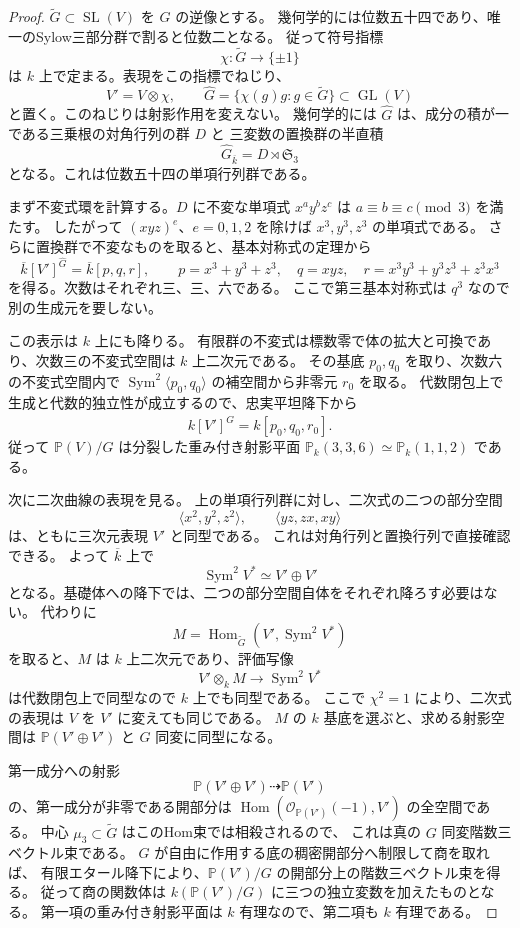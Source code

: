 \begin{proof}
$\widetilde G\subset\operatorname{SL}(V)$ を $G$ の逆像とする。
幾何学的には位数五十四であり、唯一のSylow三部分群で割ると位数二となる。
従って符号指標
\[
 \chi:\widetilde G\longrightarrow\{\pm1\}
\]
は $k$ 上で定まる。表現をこの指標でねじり、
\[
 V'=V\otimes\chi,\qquad
 \widehat G=\{\chi(g)g:g\in\widetilde G\}\subset\operatorname{GL}(V)
\]
と置く。このねじりは射影作用を変えない。
幾何学的には $\widehat G$ は、成分の積が一である三乗根の対角行列の群 $D$ と
三変数の置換群の半直積
\[
 \widehat G_{\overline k}=D\rtimes\mathfrak S_3
\]
となる。これは位数五十四の単項行列群である。

まず不変式環を計算する。$D$ に不変な単項式 $x^ay^bz^c$ は
$a\equiv b\equiv c\pmod3$ を満たす。
したがって $(xyz)^e$、$e=0,1,2$ を除けば $x^3,y^3,z^3$ の単項式である。
さらに置換群で不変なものを取ると、基本対称式の定理から
\[
 \overline k[V']^{\widehat G}
 =\overline k[p,q,r],\qquad
 p=x^3+y^3+z^3,\quad q=xyz,\quad
 r=x^3y^3+y^3z^3+z^3x^3
\]
を得る。次数はそれぞれ三、三、六である。
ここで第三基本対称式は $q^3$ なので別の生成元を要しない。

この表示は $k$ 上にも降りる。
有限群の不変式は標数零で体の拡大と可換であり、次数三の不変式空間は $k$ 上二次元である。
その基底 $p_0,q_0$ を取り、次数六の不変式空間内で
$\operatorname{Sym}^2\langle p_0,q_0\rangle$ の補空間から非零元 $r_0$ を取る。
代数閉包上で生成と代数的独立性が成立するので、忠実平坦降下から
\[
 k[V']^{\widehat G}=k[p_0,q_0,r_0].
\]
従って $\mathbb P(V)/G$ は分裂した重み付き射影平面
$\mathbb P_k(3,3,6)\simeq\mathbb P_k(1,1,2)$ である。

次に二次曲線の表現を見る。
上の単項行列群に対し、二次式の二つの部分空間
\[
 \langle x^2,y^2,z^2\rangle,
 \qquad \langle yz,zx,xy\rangle
\]
は、ともに三次元表現 $V'$ と同型である。
これは対角行列と置換行列で直接確認できる。
よって $\overline k$ 上で
\[
 \operatorname{Sym}^2V^*\simeq V'\oplus V'
\]
となる。基礎体への降下では、二つの部分空間自体をそれぞれ降ろす必要はない。
代わりに
\[
 M=\operatorname{Hom}_{\widetilde G}
       (V',\operatorname{Sym}^2V^*)
\]
を取ると、$M$ は $k$ 上二次元であり、評価写像
\[
 V'\otimes_kM\longrightarrow\operatorname{Sym}^2V^*
\]
は代数閉包上で同型なので $k$ 上でも同型である。
ここで $\chi^2=1$ により、二次式の表現は $V$ を $V'$ に変えても同じである。
$M$ の $k$ 基底を選ぶと、求める射影空間は
$\mathbb P(V'\oplus V')$ と $G$ 同変に同型になる。

第一成分への射影
\[
 \mathbb P(V'\oplus V')\dashrightarrow\mathbb P(V')
\]
の、第一成分が非零である開部分は
$\operatorname{Hom}(\mathcal O_{\mathbb P(V')}(-1),V')$ の全空間である。
中心 $\mu_3\subset\widetilde G$ はこのHom束では相殺されるので、
これは真の $G$ 同変階数三ベクトル束である。
$G$ が自由に作用する底の稠密開部分へ制限して商を取れば、
有限エタール降下により、$\mathbb P(V')/G$ の開部分上の階数三ベクトル束を得る。
従って商の関数体は $k(\mathbb P(V')/G)$ に三つの独立変数を加えたものとなる。
第一項の重み付き射影平面は $k$ 有理なので、第二項も $k$ 有理である。
\end{proof}

